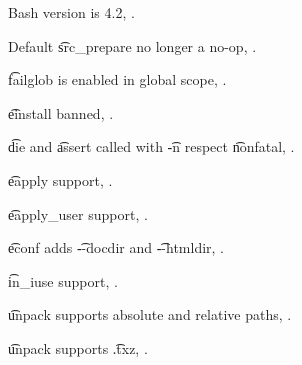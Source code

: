 \begin{compactitem}
\item Bash version is 4.2, .
\item Default \t{src\_prepare} no longer a no-op, .
\item \t{failglob} is enabled in global scope, .
\item \t{einstall} banned, .
\item \t{die} and \t{assert} called with \t{-n} respect \t{nonfatal}, .
\item \t{eapply} support, .
\item \t{eapply\_user} support, .
\item \t{econf} adds \t{-{}-docdir} and \t{-{}-htmldir}, .
\item \t{in\_iuse} support, .
\item \t{unpack} supports absolute and relative paths, .
\item \t{unpack} supports \t{.txz}, .
\end{compactitem}



